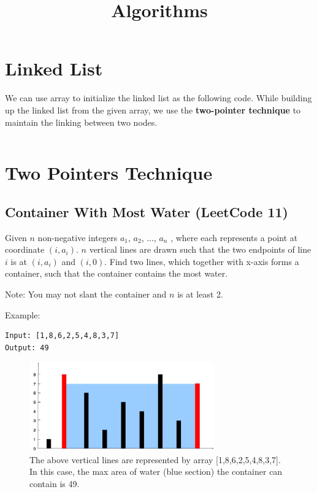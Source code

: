 \documentclass[11pt]{article}
\title{Algorithms}
\begin{document}
\maketitle

\tableofcontents

\section{Linked List}
We can use array to initialize the linked list as the following code.
While building up the linked list from the given array, we use the \textbf{two-pointer technique} to maintain the linking between two nodes.
\inputminted[breaklines=true,frame=leftline, linenos=true]{python}{src/linkedlist.py}

\section{Two Pointers Technique}
\subsection{Container With Most Water (LeetCode 11)}
Given $n$ non-negative integers $a_1$, $a_2$, ..., $a_n$ , where each represents a point at coordinate $(i, a_i)$. 
$n$ vertical lines are drawn such that the two endpoints of line $i$ is at $(i, a_i)$ and $(i, 0)$. 
Find two lines, which together with x-axis forms a container, such that the container contains the most water.

Note: You may not slant the container and $n$ is at least 2.

Example:
\begin{verbatim}
Input: [1,8,6,2,5,4,8,3,7]
Output: 49
\end{verbatim}

\begin{figure}[h]
\centering
\includegraphics[width=8cm]{pic/question_11.jpg}
\caption{The above vertical lines are represented by array [1,8,6,2,5,4,8,3,7]. In this case, the max area of water (blue section) the container can contain is 49.}
\end{figure}
\end{document}
